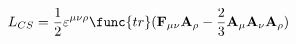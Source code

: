 \begin{equation}
L_{CS}=\frac{1}{2}\varepsilon ^{\mu \nu \rho }\func{tr}({\bf
F}_{\mu \nu}{\bf A}_{\rho }-\frac{2}{3}{\bf A}_{\mu }{\bf
A}_{\nu}{\bf A}_{\rho }) \label{eqn:LCS}
\end{equation}

